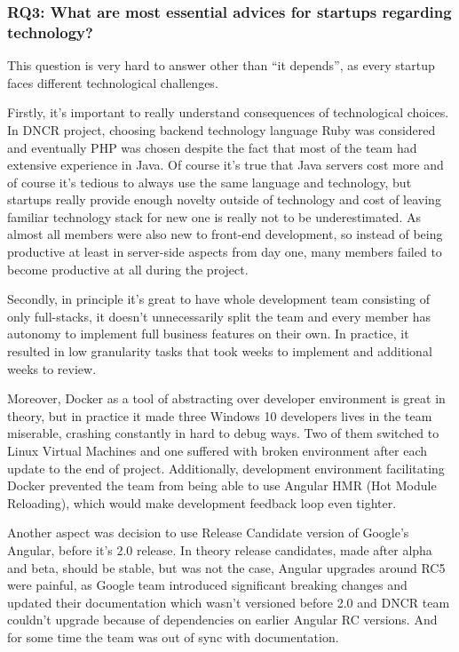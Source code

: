 \documentclass{article}
\begin{document}
\subsubsection{RQ3: What are most essential advices for startups regarding technology?}
This question is very hard to answer other than ``it depends'', as every startup faces different technological challenges.

Firstly, it's important to really understand consequences of technological choices. In DNCR project, choosing backend technology language Ruby was considered and eventually PHP was chosen despite the fact that most of the team had extensive experience in Java. Of course it's true that Java servers cost more and of course it's tedious to always use the same language and technology, but startups really provide enough novelty outside of technology and cost of leaving familiar technology stack for new one is really not to be underestimated. As almost all members were also new to front-end development, so instead of being productive at least in server-side aspects from day one, many members failed to become productive at all during the project.

Secondly, in principle it's great to have whole development team consisting of only full-stacks, it doesn't unnecessarily split the team and every member has autonomy to implement full business features on their own. In practice, it resulted in low granularity tasks that took weeks to implement and additional weeks to review.

Moreover, Docker as a tool of abstracting over developer environment is great in theory, but in practice it made three Windows 10 developers lives in the team miserable, crashing constantly in hard to debug ways. Two of them switched to Linux Virtual Machines and one suffered with broken environment after each update to the end of project. Additionally, development environment facilitating Docker prevented the team from being able to use Angular HMR (Hot Module Reloading), which would make development feedback loop even tighter.

Another aspect was decision to use Release Candidate version of Google's Angular, before it's 2.0 release. In theory release candidates, made after alpha and beta, should be stable, but was not the case, Angular upgrades around RC5 were painful, as Google team introduced significant breaking changes and updated their documentation which wasn't versioned before 2.0 and DNCR team couldn't upgrade because of dependencies on earlier Angular RC versions. And for some time the team was out of sync with documentation.
\end{document}
